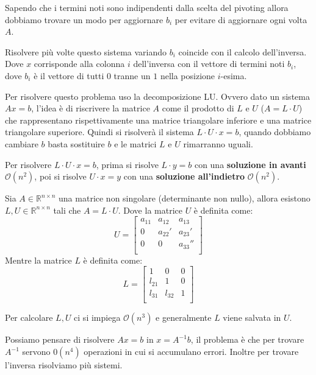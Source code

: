 Sapendo che i termini noti sono indipendenti dalla scelta del pivoting allora
dobbiamo trovare un modo per aggiornare $b_i$ per evitare di aggiornare ogni
volta $A$.
\begin{osservazione}
    Risolvere più volte questo sistema variando $b_i$ coincide con il calcolo
    dell'inversa. Dove $x$ corrisponde alla colonna $i$ dell'inversa con il
    vettore di termini noti $b_i$, dove $b_i$ è il vettore di tutti $0$ tranne
    un $1$ nella posizione $i$-esima.
\end{osservazione}
Per risolvere questo problema uso la decomposizione LU. Ovvero dato un sistema
$Ax=b$, l'idea è di riscrivere la matrice $A$ come il prodotto di $L$ e $U$ ($A
    = L \cdot U$) che rappresentano rispettivamente una matrice triangolare
inferiore e una matrice triangolare superiore. Quindi si risolverà il sistema $L
    \cdot U \cdot x = b$, quando dobbiamo cambiare $b$ basta sostituire $b$ e le
matrici $L$ e $U$ rimarranno uguali.

Per risolvere $L\cdot U \cdot x =b$, prima si risolve $L\cdot y =b$ con una
\textbf{soluzione in avanti} $\mathcal{O}(n^2)$, poi si risolve $U \cdot x = y$
con una \textbf{soluzione all'indietro} $\mathcal{O}(n^2)$.
\begin{teorema}
    Sia $A \in \mathbb{R}^{n\times n}$ una matrice non singolare (determinante
    non nullo), allora esistono $L,U \in \mathbb{R}^{n\times n}$ tali che $A =
        L \cdot U$.
    Dove la matrice $U$ è definita come:
    \begin{equation*}
        U=\left[\begin{array}{ccc}
                a_{11} & a_{12}  & a_{13}   \\
                0      & a_{22}' & a_{23}'  \\
                0      & 0       & a_{33}'' \\
            \end{array}\right]
    \end{equation*}
    Mentre la matrice $L$ è definita come:
    \begin{equation*}
        L=\left[\begin{array}{ccc}
                1      & 0       & 0       \\
                l_{21} & 1       & 0       \\
                l_{31} & l_{32}  & 1       \\
            \end{array}\right]
    \end{equation*}
\end{teorema}
Per calcolare $L,U$ ci si impiega $\mathcal{O}(n^3)$ e generalmente $L$ viene 
salvata in $U$.
\begin{nota}
    Possiamo pensare di risolvere $Ax=b$ in $x= A^{-1}b$, il problema è che per
    trovare $A^{-1}$ servono $\mathcal{0}(n^4)$ operazioni in cui si accumulano
    errori. Inoltre per trovare l'inversa risolviamo più sistemi.
\end{nota}

